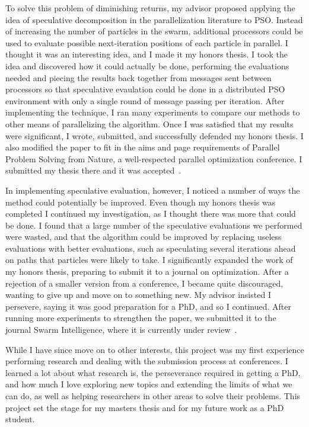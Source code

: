 \documentclass[onecolumn, 12pt]{article}
\begin{document}
To solve this problem of diminishing returns, my advisor proposed applying the
idea of speculative decomposition in the parallelization literature to PSO.
Instead of increasing the number of particles in the swarm, additional
processors could be used to evaluate possible next-iteration positions of each
particle in parallel.  I thought it was an interesting idea, and I made it my
honors thesis.  I took the idea and discovered how it could actually be done,
performing the evaluations needed and piecing the results back together from
messages sent between processors so that speculative evaulation could be done
in a distributed PSO environment with only a single round of message passing
per iteration.  After implementing the technique, I ran many experiments to
compare our methods to other means of parallelizing the algorithm.  Once I was
satisfied that my results were significant, I wrote, submitted, and
successfully defended my honors thesis.  I also modified the paper to fit in
the aims and page requirements of Parallel Problem Solving from Nature, a
well-respected parallel optimization conference.  I submitted my thesis there
and it was accepted~\cite{gardner-2010-speculative-evaluation-in-pso}.

In implementing speculative evaluation, however, I noticed a number of ways the
method could potentially be improved.  Even though my honors thesis was
completed I continued my investigation, as I thought there was more that could
be done.  I found that a large number of the speculative evaluations we
performed were wasted, and that the algorithm could be improved by replacing
useless evaluations with better evaluations, such as speculating several
iterations ahead on paths that particles were likely to take.  I significantly
expanded the work of my honors thesis, preparing to submit it to a journal on
optimization.  After a rejection of a smaller version from a conference, I
became quite discouraged, wanting to give up and move on to something new.  My
advisor insisted I persevere, saying it was good preparation for a PhD, and so
I continued.  After running more experiments to strengthen the paper, we
submitted it to the journal Swarm Intelligence, where it is currently under
review~\cite{gardner-2010-speculative-approach-to-parallelization-pso}.

While I have since move on to other interests, this project was my first
experience performing research and dealing with the submission process at
conferences.  I learned a lot about what research is, the perseverance required
in getting a PhD, and how much I love exploring new topics and extending the
limits of what we can do, as well as helping researchers in other areas to
solve their problems.  This project set the stage for my masters thesis and for
my future work as a PhD student.  
\end{document}
